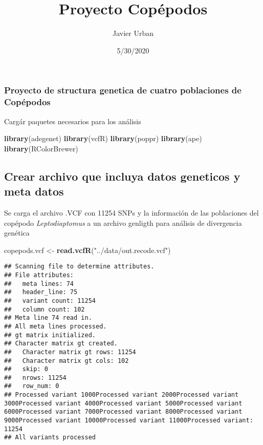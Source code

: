 \documentclass[]{article}
\title{Proyecto Copépodos}
\author{Javier Urban}
\date{5/30/2020}
\newenvironment{Shaded}{\begin{snugshade}}{\end{snugshade}}
\newcommand{\KeywordTok}[1]{\textcolor[rgb]{0.13,0.29,0.53}{\textbf{#1}}}
\newcommand{\NormalTok}[1]{#1}
\newcommand{\StringTok}[1]{\textcolor[rgb]{0.31,0.60,0.02}{#1}}
\begin{document}
\maketitle

\hypertarget{proyecto-de-structura-genetica-de-cuatro-poblaciones-de-copuxe9podos}{%
\subsubsection{Proyecto de structura genetica de cuatro poblaciones de
Copépodos}\label{proyecto-de-structura-genetica-de-cuatro-poblaciones-de-copuxe9podos}}

Cargár paquetes necesarios para los análisis

\begin{Shaded}
\begin{Highlighting}[]
\KeywordTok{library}\NormalTok{(adegenet)}
\KeywordTok{library}\NormalTok{(vcfR)}
\KeywordTok{library}\NormalTok{(poppr)}
\KeywordTok{library}\NormalTok{(ape)}
\KeywordTok{library}\NormalTok{(RColorBrewer)}
\end{Highlighting}
\end{Shaded}

\hypertarget{crear-archivo-que-incluya-datos-geneticos-y-meta-datos}{%
\subsection{Crear archivo que incluya datos geneticos y meta
datos}\label{crear-archivo-que-incluya-datos-geneticos-y-meta-datos}}

Se carga el archivo .VCF con 11254 SNPs y la información de las
poblaciones del copépodo \emph{Leptodiaptomus} a un archivo genligth
para análisis de divergencia genética

\begin{Shaded}
\begin{Highlighting}[]
\NormalTok{copepods.vcf <-}\StringTok{ }\KeywordTok{read.vcfR}\NormalTok{(}\StringTok{"../data/out.recode.vcf"}\NormalTok{)}
\end{Highlighting}
\end{Shaded}

\begin{verbatim}
## Scanning file to determine attributes.
## File attributes:
##   meta lines: 74
##   header_line: 75
##   variant count: 11254
##   column count: 102
## Meta line 74 read in.
## All meta lines processed.
## gt matrix initialized.
## Character matrix gt created.
##   Character matrix gt rows: 11254
##   Character matrix gt cols: 102
##   skip: 0
##   nrows: 11254
##   row_num: 0
## Processed variant 1000Processed variant 2000Processed variant 3000Processed variant 4000Processed variant 5000Processed variant 6000Processed variant 7000Processed variant 8000Processed variant 9000Processed variant 10000Processed variant 11000Processed variant: 11254
## All variants processed
\end{verbatim}
\end{document}
